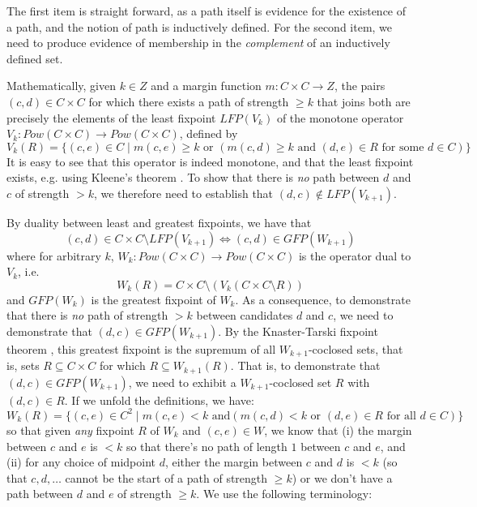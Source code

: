 \noindent
The first item is straight forward, as a path itself is evidence for the
existence of a path, and the notion of path is inductively defined.
For the second item, we need to produce evidence of membership in
the \emph{complement} of an inductively defined set.

Mathematically, given $k \in Z$ and a margin function $m: C \times C
\to Z$, the pairs $(c, d) \in C \times C$ for which there exists a
path of strength $\geq k$ that joins both are precisely the elements
of the least fixpoint $LFP(V_k)$ of the monotone operator $V_k:
Pow(C \times C) \to Pow(C \times C)$, defined by
\[ V_k(R) = \lbrace (c, e) \in C \mid m(c, e) \geq k \mbox{ or }
(m(c, d) \geq k \mbox{ and } (d, e) \in R \mbox{ for some } d \in C)
\rbrace \]
It is easy to see that this operator is indeed monotone, and that
the least fixpoint exists, e.g. using Kleene's theorem
\citep{Stoltenberg-Hansen:1994:MTD}.  To show that there is \emph{no}
path between $d$ and $c$ of strength $> k$, we therefore need to
establish that
$(d, c) \notin LFP(V_{k+1})$.

By duality between least and greatest fixpoints, we have that \[
(c, d) \in C \times C
\setminus LFP(V_{k+1}) \iff (c,d) \in GFP(W_{k+1}) \]
where for arbitrary $k$, $W_k: Pow(C \times C) \to Pow(C \times C)$ is the operator dual
to $V_k$, i.e.
\[ W_k(R) = C \times C \setminus (V_k (C\times C \setminus R)) \]
and $GFP(W_k)$ is the greatest fixpoint of $W_k$.
As a consequence, to demonstrate that there is \emph{no} path of
strength $> k$ between candidates $d$ and $c$, we need to
demonstrate that $(d, c) \in GFP(W_{k+1})$. By the Knaster-Tarski fixpoint
theorem \citep{Tarski:1955:LTF}, this greatest fixpoint is the supremum of all
$W_{k+1}$-coclosed sets, that is, sets $R \subseteq C \times C$ for which
$R \subseteq W_{k+1}(R)$.
That is, to demonstrate that $(d, c) \in GFP(W_{k+1})$, we need
to exhibit a $W_{k+1}$-coclosed set $R$ with $(d, c) \in R$.
If we unfold the definitions, we have:
\[ W_k(R) = \lbrace (c, e) \in C^2 \mid m(c, e) < k \mbox{ and
} (m(c, d) < k \mbox{ or } (d,e) \in R \mbox{ for all } d \in C)
\rbrace \]
so that given \emph{any} fixpoint $R$ of $W_k$ and $(c, e) \in W$, we
know that (i) the margin between $c$ and $e$ is $< k$ so that
there's no path of length $1$ between $c$ and $e$, and (ii) for any
choice of midpoint $d$, either the margin between $c$ and $d$ is $<
k$ (so that $c, d, \dots$ cannot be the start of a path of strength
$\geq k$) or we don't have a path between $d$ and $e$ of strength
$\geq k$. We use the following terminology:

